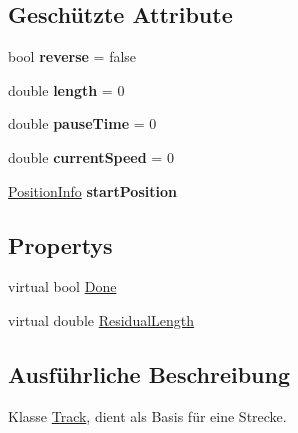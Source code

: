\subsection*{Geschützte Attribute}
\begin{DoxyCompactItemize}
\item 
\hypertarget{class_robot_ctrl_1_1_track_a98f9e9a8f087b8c7770d8f8320d821c5}{
bool {\bfseries reverse} = false}
\label{class_robot_ctrl_1_1_track_a98f9e9a8f087b8c7770d8f8320d821c5}

\item 
\hypertarget{class_robot_ctrl_1_1_track_ad4fd8df6c4813180fe764d327a9a9af8}{
double {\bfseries length} = 0}
\label{class_robot_ctrl_1_1_track_ad4fd8df6c4813180fe764d327a9a9af8}

\item 
\hypertarget{class_robot_ctrl_1_1_track_a98771bf28c921adf67e6df981dcf8e2a}{
double {\bfseries pauseTime} = 0}
\label{class_robot_ctrl_1_1_track_a98771bf28c921adf67e6df981dcf8e2a}

\item 
\hypertarget{class_robot_ctrl_1_1_track_ac8722c422d19d4b18430b106275bc9f9}{
double {\bfseries currentSpeed} = 0}
\label{class_robot_ctrl_1_1_track_ac8722c422d19d4b18430b106275bc9f9}

\item 
\hypertarget{class_robot_ctrl_1_1_track_a731b5abc7baa77c51b72c5dea7cbfba8}{
\hyperlink{struct_robot_ctrl_1_1_position_info}{PositionInfo} {\bfseries startPosition}}
\label{class_robot_ctrl_1_1_track_a731b5abc7baa77c51b72c5dea7cbfba8}

\end{DoxyCompactItemize}
\subsection*{Propertys}
\begin{DoxyCompactItemize}
\item 
virtual bool \hyperlink{class_robot_ctrl_1_1_track_ad1c4864f7171475914ef5c0111a0d901}{Done}
\item 
virtual double \hyperlink{class_robot_ctrl_1_1_track_a4f01da358c21733d43ac272d3fb549cc}{ResidualLength}
\end{DoxyCompactItemize}


\subsection{Ausführliche Beschreibung}
Klasse \hyperlink{class_robot_ctrl_1_1_track}{Track}, dient als Basis f\"{u}r eine Strecke. 

